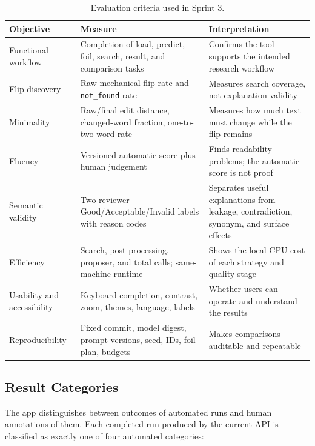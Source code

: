 \documentclass[11pt,a4paper]{article}
\begin{document}
\begin{table}[htbp]
\centering
\small
\begin{tabularx}{\textwidth}{@{}L{2.7cm}Y Y@{}}
\toprule
\textbf{Objective} & \textbf{Measure} & \textbf{Interpretation} \\
\midrule
Functional workflow & Completion of load, predict, foil, search, result, and comparison tasks & Confirms the tool supports the intended research workflow \\
Flip discovery & Raw mechanical flip rate and \texttt{not\_found} rate & Measures search coverage, not explanation validity \\
Minimality & Raw/final edit distance, changed-word fraction, one-to-two-word rate & Measures how much text must change while the flip remains \\
Fluency & Versioned automatic score plus human judgement & Finds readability problems; the automatic score is not proof \\
Semantic validity & Two-reviewer Good/Acceptable/Invalid labels with reason codes & Separates useful explanations from leakage, contradiction, synonym, and surface effects \\
Efficiency & Search, post-processing, proposer, and total calls; same-machine runtime & Shows the local CPU cost of each strategy and quality stage \\
Usability and accessibility & Keyboard completion, contrast, zoom, themes, language, labels & Whether users can operate and understand the results \\
Reproducibility & Fixed commit, model digest, prompt versions, seed, IDs, foil plan, budgets & Makes comparisons auditable and repeatable \\
\bottomrule
\end{tabularx}
\caption{Evaluation criteria used in Sprint 3.}
\label{tab:criteria}
\end{table}

\subsection{Result Categories}

The app distinguishes between outcomes of automated runs and human annotations of
them. Each completed run produced by the current API is classified as exactly one of
four automated categories:
\end{document}

